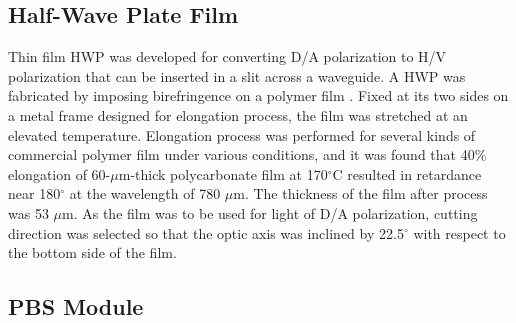 \documentclass[letterpaper, 10pt]{article}
\begin{document}
\subsection{Half-Wave Plate Film}
Thin film HWP was developed for converting D/A polarization to H/V polarization that can be inserted in a slit across a waveguide.
A HWP was fabricated by imposing birefringence on a polymer film \cite{Ando:1993up}.
Fixed at its two sides on a metal frame designed for elongation process, the film was stretched at an elevated temperature.
Elongation process was performed for several kinds of commercial polymer film under various conditions, and it was found that 40\% elongation of 60-$\mu$m-thick polycarbonate film at 170$^\circ$C resulted in retardance near 180$^\circ$ at the wavelength of 780 $\mu$m.
The thickness of the film after process was 53 $\mu$m.
As the film was to be used for light of D/A polarization, cutting direction was selected so that the optic axis was inclined by 22.5$^\circ$ with respect to the bottom side of the film.

\subsection{PBS Module}
\end{document}
